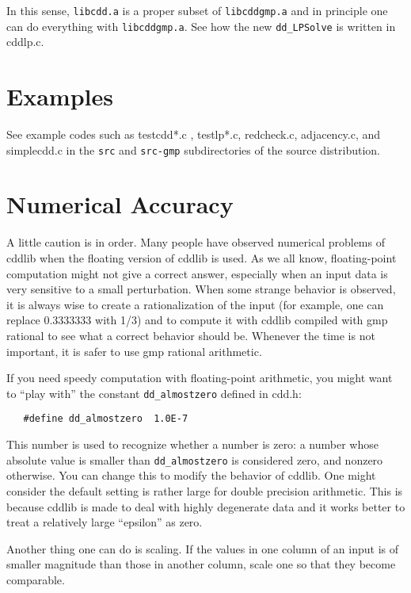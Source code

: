 \documentclass[11pt]{article}
\newcommand {\0} {{\bf 0}}
\begin{document}
In this sense,  {\tt libcdd.a} is a proper subset of  {\tt libcddgmp.a} and in principle one can
do everything with  {\tt libcddgmp.a}.   See how the new {\tt dd\_LPSolve} is written in
cddlp.c.


\section{Examples}  \label{EXAMPLES}

See example codes such as testcdd*.c , testlp*.c, redcheck.c, adjacency.c,
and simplecdd.c 
in the {\tt src} and {\tt src-gmp} subdirectories of the source
distribution.

\section{Numerical Accuracy}  \label{accuracy}
 A little caution is in order.  Many people have observed 
numerical problems of cddlib when the floating version of cddlib
is used.   As we all know, floating-point computation
might not give a correct answer, especially when an input
data is very sensitive to a small perturbation.  When
some strange behavior is observed, it is always wise
to create a rationalization of the input
(for example, one can replace 0.3333333 with 1/3)
and to compute it with cddlib compiled with gmp rational
to see what a correct behavior should be.  Whenever the time
is not important, it is safer to use gmp rational arithmetic.

If you need speedy computation with floating-point arithmetic,
you might want to ``play with'' the constant {\tt dd\_almostzero} 
defined in cdd.h:

\begin{verbatim}
   #define dd_almostzero  1.0E-7
\end{verbatim}
\noindent
This number is used to recognize whether a number is zero:  
a number whose absolute value is smaller
than {\tt dd\_almostzero} is considered zero, and nonzero otherwise.
You can change this to modify the behavior of cddlib.  One might
consider the default setting is rather large for double
precision arithmetic.  This is because cddlib is made
to deal with highly degenerate data and it works better
to treat a relatively large ``epsilon'' as zero.

Another thing one can do is scaling.  If the values in one column of
an input is of smaller magnitude than those in another column, 
scale one so that they become comparable.
\end{document}
